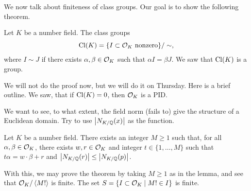 \newpage
We now talk about finiteness of class groups. Our goal is to show the following theorem.
\begin{theorem*} %
    Let $K$ be a number field. The class groups
    \[ \operatorname{Cl}(K) = \{I \subset \mathcal O_K \text{ nonzero}\} / \sim, \]
    where $I \sim J$ if there exists $\alpha, \beta \in \mathcal O_K$ such that $\alpha I = \beta J$. We saw that $\operatorname{Cl}(K)$ is a group.
\end{theorem*}
We will not do the proof now, but we will do it on Thursday. Here is a brief outline. We saw, that if $\operatorname{Cl}(K) = 0$, then $\mathcal O_K$ is a PID.

We want to see, to what extent, the field norm (fails to) give the structure of a Euclidean domain. Try to use $\left\lvert N_{K/\mathbb Q}(x) \right\rvert$ as the function.
\begin{lemma*}
    Let $K$ be a number field. There exists an integer $M \geq 1$ such that, for all $\alpha, \beta \in \mathcal O_K$, there exists $w, r \in \mathcal O_K$ and integer $t \in \{1,\dots, M\}$ such that $t \alpha = w \cdot \beta + r$ and $\left\lvert N_{K/\mathbb Q}(r) \right\rvert \leq \left\lvert N_{K/\mathbb Q}(p) \right\rvert$.
\end{lemma*}

With this, we may prove the theorem by taking $M \geq 1$ as in the lemma, and see that $\mathcal O_K/\left<M!\right>$ is finite. The set $S = \{I \subset \mathcal O_K \mid M! \in I\}$ is finite.